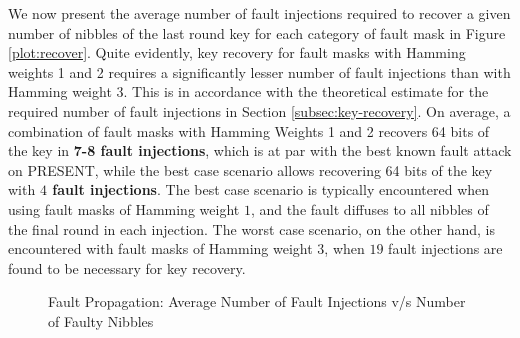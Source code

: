 \documentclass[10pt, conference, compsocconf]{IEEEtran}  %
\numberwithin{Definition}{section}
\numberwithin{Claim}{section}
\begin{document}
We now present the average number of fault injections required to recover a given number of nibbles of the last round key for each category of fault mask in Figure \ref{plot:recover}. Quite evidently, key recovery for fault masks with Hamming weights 1 and 2 requires a significantly lesser number of fault injections than with Hamming weight 3. This is in accordance with the theoretical estimate for the required number of fault injections in Section \ref{subsec:key-recovery}. On average, a combination of fault masks with Hamming Weights 1 and 2 recovers 64 bits of the key in \textbf{7-8 fault injections}, which is at par with the best known fault attack on PRESENT, while the best case scenario allows recovering 64 bits of the key with \textbf{$4$ fault injections}. The best case scenario is typically encountered when using fault masks of Hamming weight $1$, and the fault diffuses to all nibbles of the final round in each injection. The worst case scenario, on the other hand, is encountered with fault masks of Hamming weight $3$, when $19$ fault injections are found to be necessary for key recovery.
\begin{figure}[t]
\centering
\caption{Fault Propagation: Average Number of Fault Injections v/s Number of Faulty Nibbles}
\label{plot:prop}
\end{figure}
\end{document}

